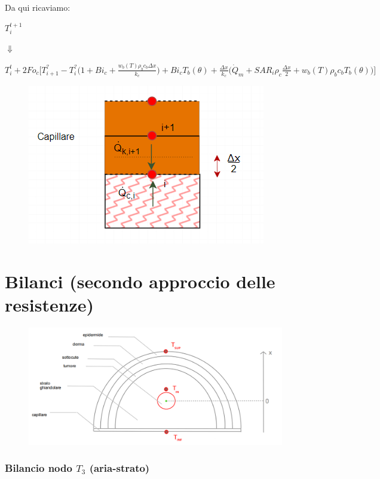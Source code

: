 Da qui ricaviamo:
\begin{center}
	$T_i ^{t+1}$
 \begin{center}
    \begin{center}
        $\Downarrow$
    \end{center}
 \end{center}
 $T_i ^t + 2 Fo_{c} \Bigg[ T_{i+1} ^? - T_i ^? \Big(1 + Bi_{c} +  \frac{ w_b (T) \rho _b c_b \Delta x }{k_{c}} \Big) + Bi_{c} T_{b}(\theta) +  \frac{\Delta x }{k_{c}} \Big(\Dot{Q} _{m} +  SAR_i \rho _{c} \frac{\Delta x}{2} + w_b (T) \rho _b c_b T_b(\theta)\Big) \Bigg]$
\end{center}


\begin{figure}[H]
    \centering
    \includegraphics[width=.4\textwidth]{Immagini/Nodi/nodo22.png} 
    \label{nodo22}
\end{figure}

\newpage


\section*{Bilanci (secondo approccio delle resistenze)}

\begin{figure}[H]
	\centering
	\includegraphics[width=.6\textwidth]{Immagini/sistema_3Nodi.png} 
	\label{sistema3Nodi}
\end{figure}


\subsubsection*{Bilancio nodo $T_3$ (aria-strato)}



